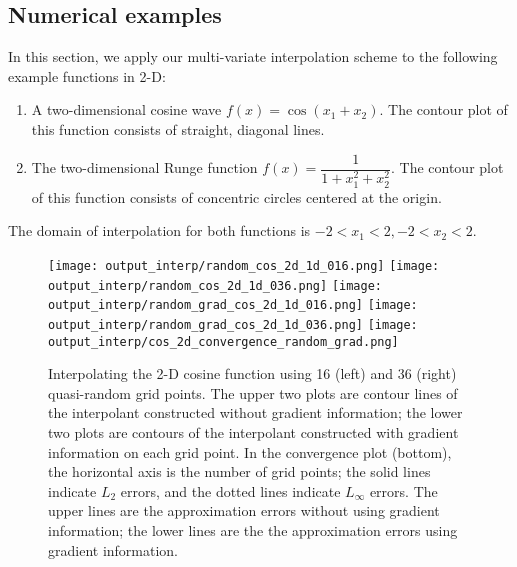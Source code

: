 % 




\subsection{Numerical examples}

In this section, we apply our multi-variate interpolation scheme to the
following example functions in 2-D:
\begin{enumerate}
\item A two-dimensional cosine wave $f(x) = \cos (x_1 + x_2)$.
      The contour plot of this function consists of straight, diagonal lines.
\item The two-dimensional Runge function $f(x) = \dfrac{1}{1 + x_1^2 + x_2^2}$.
      The contour plot of this function consists of concentric circles centered
      at the origin.
\end{enumerate}
The domain of interpolation for both functions is $-2 < x_1 < 2, -2 < x_2 < 2$.

\begin{figure}[tb!] \centering
\texttt{[image: output\_interp/random\_cos\_2d\_1d\_016.png]}
\texttt{[image: output\_interp/random\_cos\_2d\_1d\_036.png]}
\texttt{[image: output\_interp/random\_grad\_cos\_2d\_1d\_016.png]}
\texttt{[image: output\_interp/random\_grad\_cos\_2d\_1d\_036.png]}
\texttt{[image: output\_interp/cos\_2d\_convergence\_random\_grad.png]}
\caption{Interpolating the 2-D cosine function using 16 (left) and
         36 (right) quasi-random grid points.  The upper two plots are contour
         lines of the interpolant constructed without gradient information;
         the lower two plots are contours of the interpolant constructed with
         gradient information on each grid point.
         In the convergence plot (bottom), the horizontal axis is the
         number of grid points;
         the solid lines indicate $L_2$ errors, and the dotted lines indicate
         $L_{\infty}$ errors.  The upper lines are the approximation errors
         without using gradient information; the lower lines are the
         the approximation errors using gradient information.}
\label{interp_cos2d_randomgrad}
\end{figure}

